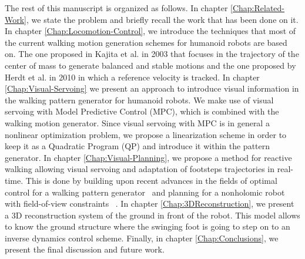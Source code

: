 The rest of this manuscript is organized as follows. In chapter \ref{Chap:Related-Work}, we state the problem and briefly recall the work that has been done on it. In chapter \ref{Chap:Locomotion-Control}, we introduce the techniques that most of the current walking motion generation schemes for humanoid robots are based on. The one proposed in Kajita et al. in 2003 \citep{Kajita2003} that focuses in the trajectory of the center of mass to generate balanced and stable motions and the one proposed by Herdt et al. in 2010 \citep{HerdtAR2010} in which a reference velocity is tracked. In chapter \ref{Chap:Visual-Servoing} we present an approach to introduce visual information in the walking pattern generator for humanoid robots. We make use of visual servoing with Model Predictive Control (MPC), which is combined with the walking motion generator. Since visual servoing with MPC is in general a nonlinear optimization problem, we propose a linearization scheme in order to keep it as a Quadratic Program (QP) and introduce it within the pattern generator. In chapter \ref{Chap:Visual-Planning}, we propose a method for reactive walking allowing visual servoing and adaptation of footsteps trajectories in real-time. This is done by building upon recent advances in the fields of optimal control for a walking pattern generator~\citep{HerdtAR2010} and planning for a nonholomic robot with field-of-view constraints ~\citep{Salaris:2010}. In chapter \ref{Chap:3DReconstruction}, we present a 3D reconstruction system of the ground in front of the robot. This model allows to know the ground structure where the swinging foot is going to step on to an inverse dynamics control scheme. Finally, in chapter \ref{Chap:Conclusions}, we present the final discussion and future work.


